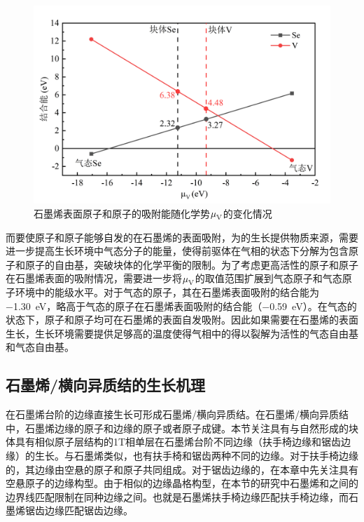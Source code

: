     \begin{figure}[htb]
        \includegraphics{pic/VS_DFT_adatoms.png}
        \caption{石墨烯表面原子和原子的吸附能随化学势$\it \mu_{\rm V}^{\rm } \it$的变化情况}
        \label{fig:VS_DFT_adatoms}
    \end{figure}

    而要使原子和原子能够自发的在石墨烯的表面吸附，为的生长提供物质来源，需要进一步提高生长环境中气态分子的能量，使得前驱体在气相的状态下分解为包含原子和原子的自由基，突破块体的化学平衡的限制。为了考虑更高活性的原子和原子在石墨烯表面的吸附情况，需要进一步将$\it \mu_{\rm V}^{\rm } \it$的取值范围扩展到气态原子和气态原子环境中的能级水平。对于气态的原子，其在石墨烯表面吸附的结合能为\SI{-1.30}{\electronvolt}，略高于气态的原子在石墨烯表面吸附的结合能（\SI{-0.59}{\electronvolt}）。在气态的状态下，原子和原子均可在石墨烯的表面自发吸附。因此如果需要在石墨烯的表面生长，生长环境需要提供足够高的温度使得气相中的得以裂解为活性的气态自由基和气态自由基。

\subsection{石墨烯/横向异质结的生长机理}
    在石墨烯台阶的边缘直接生长可形成石墨烯/横向异质结。在石墨烯/横向异质结中，石墨烯边缘的原子和边缘的原子或者原子成键。本节关注具有与自然形成的块体具有相似原子层结构的1T相单层在石墨烯台阶不同边缘（扶手椅边缘和锯齿边缘）的生长。与石墨烯类似，也有扶手椅和锯齿两种不同的边缘。对于扶手椅边缘的，其边缘由空悬的原子和原子共同组成。对于锯齿边缘的，在本章中先关注具有空悬原子的边缘构型。由于相似的边缘晶格构型，在本节的研究中石墨烯和之间的边界线匹配限制在同种边缘之间。也就是石墨烯扶手椅边缘匹配扶手椅边缘，而石墨烯锯齿边缘匹配锯齿边缘。

